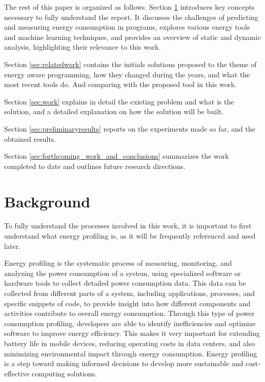 \documentclass[sigplan]{acmart}
\begin{document}
The rest of this paper is organized as follows. 
Section \ref{sec:background} introduces key concepts necessary to fully understand the report. It discusses the challenges of predicting and measuring energy consumption in programs, explores various energy tools and machine learning techniques, and provides an overview of static and dynamic analysis, highlighting their relevance to this work.

Section \ref{sec:relatedwork} contains the initials solutions proposed to the theme of energy aware programming, how they changed during the years, and what the most recent tools do. And comparing with the proposed tool in this work.

Section \ref{sec:work} explains in detail the existing problem and what is the solution, and a detailed explanation on how the solution will be built.

Section \ref{sec:preliminaryresults} reports on the experiments made so far, and the obtained results.

Section \ref{sec:forthcoming_work_and_conclusions} summarizes the work completed to date and outlines future research directions.


\section{Background} \label{sec:background}

To fully understand the processes involved in this work, it is important to first understand what energy profiling is, as it will be frequently referenced and used later.

Energy profiling is the systematic process of measuring, monitoring, and analyzing the power consumption of a system, using specialized software or hardware tools to collect detailed power consumption data. This data can be collected from different parts of a system, including applications, processes, and specific snippets of code, to provide insight into how different components and activities contribute to overall energy consumption. Through this type of power consumption profiling, developers are able to identify inefficiencies and optimize software to improve energy efficiency. This makes it very important for extending battery life in mobile devices, reducing operating costs in data centers, and also minimizing environmental impact through energy consumption. Energy profiling is a step toward making informed decisions to develop more sustainable and cost-effective computing solutions.
\end{document}
